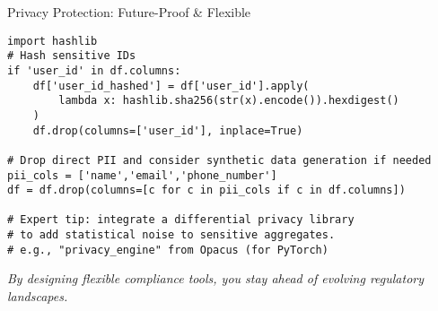 \documentclass[aspectratio=169]{beamer}
\begin{document}
\begin{frame}{Privacy Protection: Future-Proof & Flexible}
\begin{verbatim}
import hashlib
# Hash sensitive IDs
if 'user_id' in df.columns:
    df['user_id_hashed'] = df['user_id'].apply(
        lambda x: hashlib.sha256(str(x).encode()).hexdigest()
    )
    df.drop(columns=['user_id'], inplace=True)

# Drop direct PII and consider synthetic data generation if needed
pii_cols = ['name','email','phone_number']
df = df.drop(columns=[c for c in pii_cols if c in df.columns])

# Expert tip: integrate a differential privacy library
# to add statistical noise to sensitive aggregates.
# e.g., "privacy_engine" from Opacus (for PyTorch)
\end{verbatim}

\emph{By designing flexible compliance tools, you stay ahead of evolving regulatory landscapes.}
\end{frame}
\end{document}
